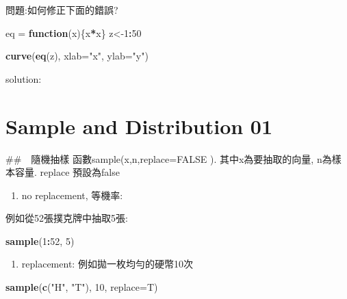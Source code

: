 \documentclass[]{book}
\newenvironment{Shaded}{\begin{snugshade}}{\end{snugshade}}
\newcommand{\ControlFlowTok}[1]{\textcolor[rgb]{0.13,0.29,0.53}{\textbf{#1}}}
\newcommand{\DataTypeTok}[1]{\textcolor[rgb]{0.13,0.29,0.53}{#1}}
\newcommand{\DecValTok}[1]{\textcolor[rgb]{0.00,0.00,0.81}{#1}}
\newcommand{\KeywordTok}[1]{\textcolor[rgb]{0.13,0.29,0.53}{\textbf{#1}}}
\newcommand{\NormalTok}[1]{#1}
\newcommand{\OperatorTok}[1]{\textcolor[rgb]{0.81,0.36,0.00}{\textbf{#1}}}
\newcommand{\StringTok}[1]{\textcolor[rgb]{0.31,0.60,0.02}{#1}}
\providecommand{\tightlist}{%
  \setlength{\itemsep}{0pt}\setlength{\parskip}{0pt}}
\theoremstyle{definition}
\theoremstyle{definition}
\theoremstyle{definition}
\theoremstyle{remark}
\begin{document}
問題:如何修正下面的錯誤?

\begin{Shaded}
\begin{Highlighting}[]
\NormalTok{eq =}\StringTok{ }\ControlFlowTok{function}\NormalTok{(x)\{x}\OperatorTok{*}\NormalTok{x\}}
\NormalTok{z<-}\DecValTok{1}\OperatorTok{:}\DecValTok{50}

\KeywordTok{curve}\NormalTok{(}\KeywordTok{eq}\NormalTok{(z), }\DataTypeTok{xlab=}\StringTok{"x"}\NormalTok{, }\DataTypeTok{ylab=}\StringTok{"y"}\NormalTok{)}
\end{Highlighting}
\end{Shaded}

solution:

\hypertarget{sample-and-distribution-01}{%
\chapter{Sample and Distribution 01}\label{sample-and-distribution-01}}

\#\#　隨機抽樣 函數sample(x,n,replace=FALSE ). 其中x為要抽取的向量,
n為樣本容量. replace 預設為false

\begin{enumerate}
\def\labelenumi{\arabic{enumi}.}
\tightlist
\item
  no replacement, 等機率:
\end{enumerate}

例如從52張撲克牌中抽取5張:

\begin{Shaded}
\begin{Highlighting}[]
\KeywordTok{sample}\NormalTok{(}\DecValTok{1}\OperatorTok{:}\DecValTok{52}\NormalTok{, }\DecValTok{5}\NormalTok{)}
\end{Highlighting}
\end{Shaded}

\begin{enumerate}
\def\labelenumi{\arabic{enumi}.}
\setcounter{enumi}{1}
\tightlist
\item
  replacement: 例如拋一枚均勻的硬幣10次
\end{enumerate}

\begin{Shaded}
\begin{Highlighting}[]
 \KeywordTok{sample}\NormalTok{(}\KeywordTok{c}\NormalTok{(}\StringTok{"H"}\NormalTok{, }\StringTok{"T"}\NormalTok{), }\DecValTok{10}\NormalTok{, }\DataTypeTok{replace=}\NormalTok{T)}
\end{Highlighting}
\end{Shaded}
\end{document}

